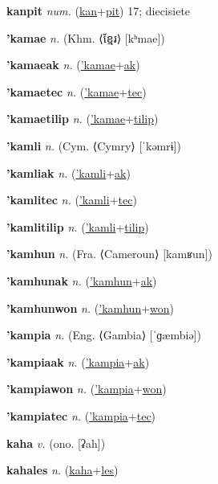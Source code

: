 \textbf{\hypertarget{kanpit}{kanpit}} \textit{num.} (\hyperlink{kan}{kan}+\allowbreak \hyperlink{pit}{pit})
17; diecisiete

\textbf{\hypertarget{'kamae}{'kamae}} \textit{n.} (Khm. ⟨{\khmer{}ខ្មែរ}⟩ [kʰmae])


\textbf{\hypertarget{'kamaeak}{'kamaeak}} \textit{n.} (\hyperlink{'kamae}{'kamae}+\allowbreak \hyperlink{ak}{ak})


\textbf{\hypertarget{'kamaetec}{'kamaetec}} \textit{n.} (\hyperlink{'kamae}{'kamae}+\allowbreak \hyperlink{tec}{tec})


\textbf{\hypertarget{'kamaetilip}{'kamaetilip}} \textit{n.} (\hyperlink{'kamae}{'kamae}+\allowbreak \hyperlink{tilip}{tilip})


\textbf{\hypertarget{'kamli}{'kamli}} \textit{n.} (Cym. ⟨Cymry⟩ [ˈkəmrɨ])


\textbf{\hypertarget{'kamliak}{'kamliak}} \textit{n.} (\hyperlink{'kamli}{'kamli}+\allowbreak \hyperlink{ak}{ak})


\textbf{\hypertarget{'kamlitec}{'kamlitec}} \textit{n.} (\hyperlink{'kamli}{'kamli}+\allowbreak \hyperlink{tec}{tec})


\textbf{\hypertarget{'kamlitilip}{'kamlitilip}} \textit{n.} (\hyperlink{'kamli}{'kamli}+\allowbreak \hyperlink{tilip}{tilip})


\textbf{\hypertarget{'kamhun}{'kamhun}} \textit{n.} (Fra. ⟨Cameroun⟩ [kamʁun])


\textbf{\hypertarget{'kamhunak}{'kamhunak}} \textit{n.} (\hyperlink{'kamhun}{'kamhun}+\allowbreak \hyperlink{ak}{ak})


\textbf{\hypertarget{'kamhunwon}{'kamhunwon}} \textit{n.} (\hyperlink{'kamhun}{'kamhun}+\allowbreak \hyperlink{won}{won})


\textbf{\hypertarget{'kampia}{'kampia}} \textit{n.} (Eng. ⟨Gambia⟩ [ˈɡæmbiə])


\textbf{\hypertarget{'kampiaak}{'kampiaak}} \textit{n.} (\hyperlink{'kampia}{'kampia}+\allowbreak \hyperlink{ak}{ak})


\textbf{\hypertarget{'kampiawon}{'kampiawon}} \textit{n.} (\hyperlink{'kampia}{'kampia}+\allowbreak \hyperlink{won}{won})


\textbf{\hypertarget{'kampiatec}{'kampiatec}} \textit{n.} (\hyperlink{'kampia}{'kampia}+\allowbreak \hyperlink{tec}{tec})


\textbf{\hypertarget{kaha}{kaha}} \textit{v.} (ono. [ʡah])


\textbf{\hypertarget{kahales}{kahales}} \textit{n.} (\hyperlink{kaha}{kaha}+\allowbreak \hyperlink{les}{les})


